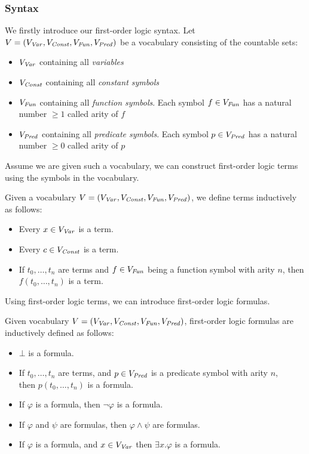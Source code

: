 \subsubsection{Syntax}
We firstly introduce our first-order logic syntax.
Let $V = (V_{\mathit{Var}}, V_{\mathit{Const}}, V_{\mathit{Fun}}, V_{\mathit{Pred}})$ be a vocabulary consisting of the countable sets:
\begin{itemize}
	\item $V_{\mathit{Var}}$ containing all \textsl{variables}
	\item $V_{\mathit{Const}}$ containing all \textsl{constant symbols}
	\item $V_{\mathit{Fun}} $ containing all \textsl{function symbols}. Each symbol $f \in V_{\mathit{Fun}}$ has a natural number $\geq 1$ called arity of $f$
 	\item $V_{\mathit{Pred}}$ containing all \textsl{predicate symbols}. Each symbol $p \in V_{\mathit{Pred}}$ has a natural number $\geq 0$ called arity of $p$
\end{itemize}
Assume we are given such a vocabulary, we can construct first-order logic terms using the symbols in the vocabulary.
\begin{mydef}[Term] 
	Given a vocabulary $V = (V_{\mathit{Var}}, V_{\mathit{Const}}, V_{\mathit{Fun}}, V_{\mathit{Pred}})$, we define terms inductively as follows:
	\begin{itemize}
		\item Every $x \in V_{\mathit{Var}}$ is a term.
		\item Every $c \in V_{\mathit{Const}}$ is a term.
		\item If $t_0, \ldots, t_n$ are terms and $f \in V_{\mathit{Fun}}$ being a function symbol with arity $n$, then $f(t_0, \ldots, t_n)$ is a term.
	\end{itemize}
\end{mydef}
Using first-order logic terms, we can introduce first-order logic formulas.
\begin{mydef}[Formula]
	Given vocabulary $V = (V_{\mathit{Var}}, V_{\mathit{Const}}, V_{\mathit{Fun}}, V_{\mathit{Pred}})$, first-order logic formulas are inductively defined as follows:
	\begin{itemize}
		\item $\bot$ is a formula.
		\item If  $t_0, \ldots, t_n$ are terms, and $p \in V_{\mathit{Pred}}$ is a predicate symbol with arity $n$, \\ then $p(t_0, \ldots, t_n)$ is a formula.
		\item If $\varphi$ is a formula, then $\neg \varphi$ is a formula.
		\item If $\varphi$ and $\psi$ are formulas, then $\varphi \land \psi$ are formulas.
		\item If $\varphi$ is a formula, and $x \in V_{\mathit{Var}}$ then $\exists x. \varphi$ is a formula.
	\end{itemize}
\end{mydef}
